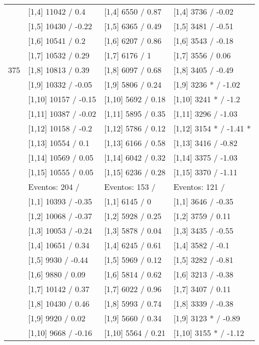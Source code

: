 \begin{table}
\begin{tabular}[t]{llll}
\addlinespace
 & {}[1,4] 11042  / 0.4 & {}[1,4] 6550  / 0.87 & {}[1,4] 3736  / -0.02\\
 & {}[1,5] 10430  / -0.22 & {}[1,5] 6365  / 0.49 & {}[1,5] 3481  / -0.51\\
 & {}[1,6] 10541  / 0.2 & {}[1,6] 6207  / 0.86 & {}[1,6] 3543  / -0.18\\
 & {}[1,7] 10532  / 0.29 & {}[1,7] 6176  / 1 & {}[1,7] 3556  / 0.06\\
375 & {}[1,8] 10813  / 0.39 & {}[1,8] 6097  / 0.68 & {}[1,8] 3405  / -0.49\\
\addlinespace
 & {}[1,9] 10332  / -0.05 & {}[1,9] 5806  / 0.24 & {}[1,9] 3236 * / -1.02\\
 & {}[1,10] 10157  / -0.15 & {}[1,10] 5692  / 0.18 & {}[1,10] 3241 * / -1.2\\
 & {}[1,11] 10387  / -0.02 & {}[1,11] 5895  / 0.35 & {}[1,11] 3296  / -1.03\\
 & {}[1,12] 10158  / -0.2 & {}[1,12] 5786  / 0.12 & {}[1,12] 3154 * / -1.41 *\\
 & {}[1,13] 10554  / 0.1 & {}[1,13] 6166  / 0.58 & {}[1,13] 3416  / -0.82\\
\addlinespace
 & {}[1,14] 10569  / 0.05 & {}[1,14] 6042  / 0.32 & {}[1,14] 3375  / -1.03\\
 & {}[1,15] 10555  / 0.05 & {}[1,15] 6236  / 0.28 & {}[1,15] 3370  / -1.11\\
 & Eventos:  204 / & Eventos:  153 / & Eventos:  121 /\\
 & {}[1,1] 10393  / -0.35 & {}[1,1] 6145  / 0 & {}[1,1] 3646  / -0.35\\
 & {}[1,2] 10068  / -0.37 & {}[1,2] 5928  / 0.25 & {}[1,2] 3759  / 0.11\\
\addlinespace
 & {}[1,3] 10053  / -0.24 & {}[1,3] 5878  / 0.04 & {}[1,3] 3435  / -0.55\\
 & {}[1,4] 10651  / 0.34 & {}[1,4] 6245  / 0.61 & {}[1,4] 3582  / -0.1\\
 & {}[1,5] 9930  / -0.44 & {}[1,5] 5969  / 0.12 & {}[1,5] 3282  / -0.81\\
 & {}[1,6] 9880  / 0.09 & {}[1,6] 5814  / 0.62 & {}[1,6] 3213  / -0.38\\
 & {}[1,7] 10142  / 0.37 & {}[1,7] 6022  / 0.96 & {}[1,7] 3407  / 0.11\\
\addlinespace
500 & {}[1,8] 10430  / 0.46 & {}[1,8] 5993  / 0.74 & {}[1,8] 3339  / -0.38\\
 & {}[1,9] 9920  / 0.02 & {}[1,9] 5660  / 0.34 & {}[1,9] 3123 * / -0.89\\
 & {}[1,10] 9668  / -0.16 & {}[1,10] 5564  / 0.21 & {}[1,10] 3155 * / -1.12\\

\end{tabular}
\end{table}
